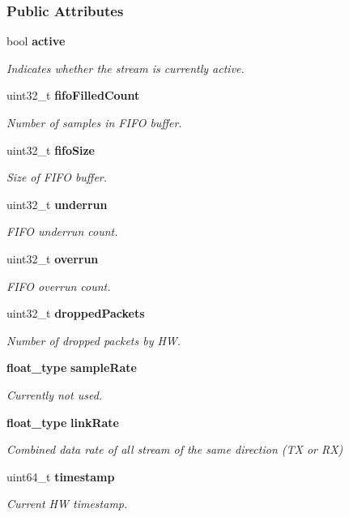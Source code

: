 \subsubsection*{Public Attributes}
\begin{DoxyCompactItemize}
\item 
bool {\bf active}
\begin{DoxyCompactList}\small\item\em Indicates whether the stream is currently active. \end{DoxyCompactList}\item 
uint32\+\_\+t {\bf fifo\+Filled\+Count}
\begin{DoxyCompactList}\small\item\em Number of samples in F\+I\+FO buffer. \end{DoxyCompactList}\item 
uint32\+\_\+t {\bf fifo\+Size}
\begin{DoxyCompactList}\small\item\em Size of F\+I\+FO buffer. \end{DoxyCompactList}\item 
uint32\+\_\+t {\bf underrun}
\begin{DoxyCompactList}\small\item\em F\+I\+FO underrun count. \end{DoxyCompactList}\item 
uint32\+\_\+t {\bf overrun}
\begin{DoxyCompactList}\small\item\em F\+I\+FO overrun count. \end{DoxyCompactList}\item 
uint32\+\_\+t {\bf dropped\+Packets}
\begin{DoxyCompactList}\small\item\em Number of dropped packets by HW. \end{DoxyCompactList}\item 
{\bf float\+\_\+type} {\bf sample\+Rate}
\begin{DoxyCompactList}\small\item\em Currently not used. \end{DoxyCompactList}\item 
{\bf float\+\_\+type} {\bf link\+Rate}
\begin{DoxyCompactList}\small\item\em Combined data rate of all stream of the same direction (TX or RX) \end{DoxyCompactList}\item 
uint64\+\_\+t {\bf timestamp}
\begin{DoxyCompactList}\small\item\em Current HW timestamp. \end{DoxyCompactList}\end{DoxyCompactItemize}


